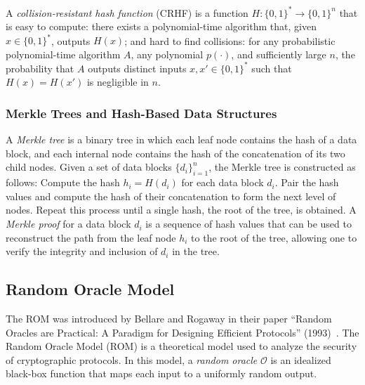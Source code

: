 \documentclass{iacrtrans}
\begin{document}
\begin{definition}
	A \textit{collision-resistant hash function} (CRHF) is a function $H: \{0, 1\}^* \to \{0, 1\}^n$ that is easy to compute: there exists a polynomial-time algorithm that, given $x \in \{0, 1\}^*$, outputs $H(x)$; and hard to find collisions: for any probabilistic polynomial-time algorithm $A$, any polynomial $p(\cdot)$, and sufficiently large $n$, the probability that $A$ outputs distinct inputs $x, x' \in \{0, 1\}^*$ such that $H(x) = H(x')$ is negligible in $n$.
\end{definition}

\subsubsection{Merkle Trees and Hash-Based Data Structures}

\begin{definition}
	A \textit{Merkle tree} is a binary tree in which each leaf node contains the hash of a data block, and each internal node contains the hash of the concatenation of its two child nodes. Given a set of data blocks $\{d_i\}_{i=1}^n$, the Merkle tree is constructed as follows: Compute the hash $h_i = H(d_i)$ for each data block $d_i$. Pair the hash values and compute the hash of their concatenation to form the next level of nodes. Repeat this process until a single hash, the root of the tree, is obtained. A \textit{Merkle proof} for a data block $d_i$ is a sequence of hash values that can be used to reconstruct the path from the leaf node $h_i$ to the root of the tree, allowing one to verify the integrity and inclusion of $d_i$ in the tree.
\end{definition}

\subsection{Random Oracle Model}

The ROM was introduced by Bellare and Rogaway in their paper ``Random Oracles are Practical: A Paradigm for Designing Efficient Protocols'' (1993)~\cite{CCS:BelRog93}. The Random Oracle Model (ROM) is a theoretical model used to analyze the security of cryptographic protocols. In this model, a \textit{random oracle} $\mathcal{O}$ is an idealized black-box function that maps each input to a uniformly random output. 
\end{document}
